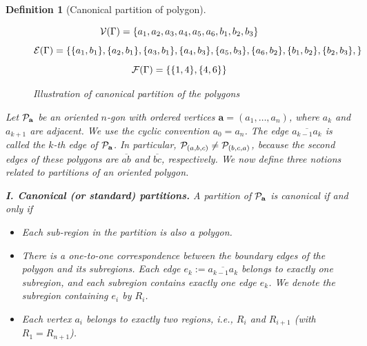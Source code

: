 \documentclass[10pt,reqno]{article}
\theoremstyle{plain} %
\newtheorem{definition}[theorem]{Definition}
\theoremstyle{remark}
\numberwithin{equation}{section}
\begin{document}
\begin{definition}[Canonical partition of polygon]
\begin{figure}[ht]
{
    }
    $${\cal V}(\Gamma)=\{ a_1,a_2,a_3,a_4,a_5,a_6,b_1,b_2,b_3 \}$$
    $${\cal E}(\Gamma)=\{\{a_1,b_1\}, \{a_2,b_1\}, 
    \{a_3,b_1\}, \{a_4,b_3\},\{a_5,b_3\},\{a_6,b_2\},\{b_1,b_2\}, \{b_2,b_3\}, \}$$
    $$
    {\cal F}(\Gamma)=\{\{1,4\},\{4,6\}\}$$
      \caption{Illustration of canonical partition of the polygons}
      \label{fig_SPPol}
\end{figure}

Let ${\cal P}_{\textbf{a}}$ be an oriented $n$-gon with ordered vertices $\textbf{a}=(a_1,\ldots,a_n)$, where $a_k$ and $a_{k+1}$ are adjacent. We use the cyclic convention $a_0=a_n$.
The edge $\overline{a_{k-1}a_k}$ is called the $k$-th edge of ${\cal P}_{\textbf{a}}$. In particular, ${\cal P}_{(a,b,c)}\ne {\cal P}_{(b,c,a)}$, because the second edges of these polygons are $\overline{ab}$ and $\overline{bc}$, respectively.
We now define three notions related to partitions of an oriented polygon.

\medskip 
\noindent\textbf{I. Canonical (or standard) partitions.} A partition of ${\cal P}_{\textbf{a}}$ is canonical if and only if
\begin{itemize}
\item Each  sub-region in the partition is also a polygon. 
     \item There is a one-to-one correspondence between the boundary edges of the polygon and its subregions. Each edge $e_k:=\overline{a_{k-1}a_k}$ belongs to exactly one subregion, and each subregion contains exactly one edge $e_k$. We denote the subregion containing $e_i$ by $R_i$.
   \item Each vertex $a_i$  belongs to exactly two regions, i.e.,  $R_i$ and $R_{i+1}$ (with $R_1=R_{n+1}$). 
  
\end{itemize}


\end{definition}
\end{document}
